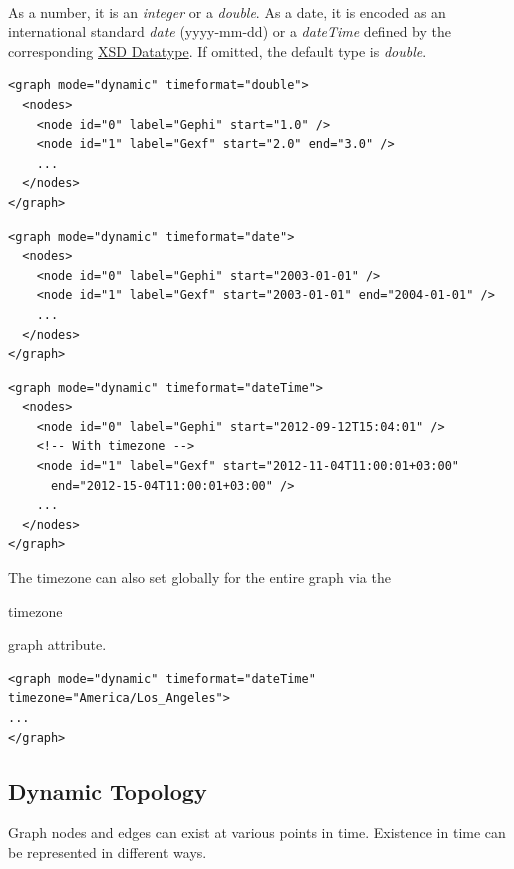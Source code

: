 \documentclass[a4paper,10pt]{article}
\begin{document}
\paragraph{}
As a number, it is an \textit{integer} or a \textit{double}. As a date, it is encoded as an international standard \textit{date} (yyyy-mm-dd) or a \textit{dateTime} defined by the corresponding \href{http://www.w3.org/TR/xmlschema-2/#dateTime}{XSD Datatype}. If omitted, the default type is \textit{double}.

\lstset{ style=gexf }
\begin{lstlisting}[caption={Double format}]
<graph mode="dynamic" timeformat="double">
  <nodes>
    <node id="0" label="Gephi" start="1.0" />
    <node id="1" label="Gexf" start="2.0" end="3.0" />
    ...
  </nodes>
</graph>
\end{lstlisting}

\lstset{ style=gexf }
\begin{lstlisting}[caption={Date format}]
<graph mode="dynamic" timeformat="date">
  <nodes>
    <node id="0" label="Gephi" start="2003-01-01" />
    <node id="1" label="Gexf" start="2003-01-01" end="2004-01-01" />
    ...
  </nodes>
</graph>
\end{lstlisting}

\lstset{ style=gexf }
\begin{lstlisting}[caption={Datetime format (also with timezone)}]
<graph mode="dynamic" timeformat="dateTime">
  <nodes>
    <node id="0" label="Gephi" start="2012-09-12T15:04:01" />
    <!-- With timezone -->
    <node id="1" label="Gexf" start="2012-11-04T11:00:01+03:00"
      end="2012-15-04T11:00:01+03:00" />
    ...
  </nodes>
</graph>
\end{lstlisting}

The timezone can also set globally for the entire graph via the \begin{footnotesize}timezone\end{footnotesize} graph attribute.

\lstset{ style=gexf }
\begin{lstlisting}[caption={Global timezone setting}]
<graph mode="dynamic" timeformat="dateTime" timezone="America/Los_Angeles">
...
</graph>
\end{lstlisting}

\subsection{Dynamic Topology}

Graph nodes and edges can exist at various points in time. Existence in time can be represented in different ways.
\end{document}
